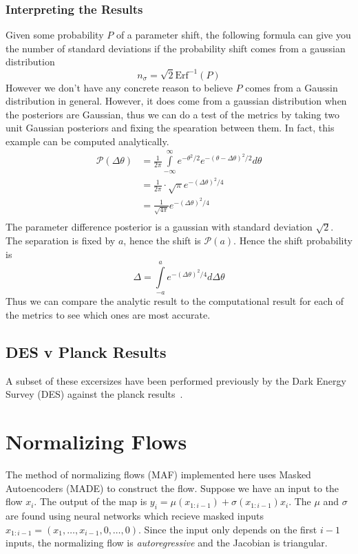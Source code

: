 \subsubsection{Interpreting the Results}
Given some probability $P$ of a parameter shift, the following formula can give you the number of standard deviations if the probability shift comes from a gaussian distribution
\begin{equation}
	n_\sigma = \sqrt{2} \text{Erf}^{-1}(P)
\end{equation}
However we don't have any concrete reason to believe $P$ comes from a Gaussin distribution in general. However, it does come from a gaussian distribution when the posteriors are Gaussian, thus we can do a test of the metrics by taking two unit Gaussian posteriors and fixing the spearation between them. In fact, this example can be computed analytically.
\begin{equation}
    \begin{split}
	\mathcal{P}(\Delta \theta) &= \frac{1}{2\pi} \int\limits_{-\infty}^{\infty} e^{-\theta^2/2} e^{-{(\theta-\Delta\theta)}^2/2}  d\theta \\
				  			   &= \frac{1}{2\pi} \cdot \sqrt{\pi} e^{-{(\Delta\theta)}^2/4}\\
				   			   &= \frac{1}{\sqrt{4\pi}}e^{-{(\Delta\theta)}^2/4}\\
    \end{split}
\end{equation}
The parameter difference posterior is a gaussian with standard deviation $\sqrt{2}$. The separation is fixed by $a$, hence the shift is $\mathcal{P}(a)$. Hence the shift probability is
\begin{equation}
	\Delta = \int\limits_{-a}^{a} e^{-{(\Delta\theta)}^2/4} d\Delta\theta
\end{equation}
Thus we can compare the analytic result to the computational result for each of the metrics to see which ones are most accurate.
\subsection{DES v Planck Results}
A subset of these excersizes have been performed previously by the Dark Energy Survey (DES) against the planck results~\cite{lemos_assessing_2021}.

\section{Normalizing Flows}
The method of normalizing flows (MAF) implemented here uses Masked Autoencoders (MADE) to construct the flow. 
Suppose we have an input to the flow $x_i$. 
The output of the map is $y_i= \mu(x_{1:i-1})+\sigma(x_{1:i-1})x_i$. 
The $\mu$ and $\sigma$ are found using neural networks which recieve masked inputs $x_{1:i-1}=(x_1,\ldots,x_{i-1},0,\ldots,0)$. 
Since the input only depends on the first $i-1$ inputs, the normalizing flow is \textit{autoregressive} and the Jacobian is triangular.

